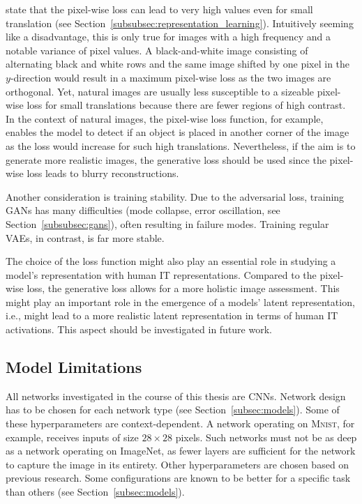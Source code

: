 \citet{larsen2015autoencoding} state that the pixel-wise loss can lead to very high values even for small translation (see Section~\ref{subsubsec:representation_learning}).
Intuitively seeming like a disadvantage, this is only true for images with a high frequency and a notable variance of pixel values.
A black-and-white image consisting of alternating black and white rows and the same image shifted by one pixel in the $y$-direction would result in a maximum pixel-wise loss as the two images are orthogonal.
Yet, natural images are usually less susceptible to a sizeable pixel-wise loss for small translations because there are fewer regions of high contrast.
In the context of natural images, the pixel-wise loss function, for example, enables the model to detect if an object is placed in another corner of the image as the loss would increase for such high translations.
Nevertheless, if the aim is to generate more realistic images, the generative loss should be used since the pixel-wise loss leads to blurry reconstructions.

Another consideration is training stability.
Due to the adversarial loss, training \acp{GAN} has many difficulties (mode collapse, error oscillation, see Section~\ref{subsubsec:gans}), often resulting in failure modes.
Training regular \acp{VAE}, in contrast, is far more stable.

The choice of the loss function might also play an essential role in studying a model's representation with human \ac{IT} representations.
Compared to the pixel-wise loss, the generative loss allows for a more holistic image assessment.
This might play an important role in the emergence of a models' latent representation, i.e., might lead to a more realistic latent representation in terms of human IT activations.
This aspect should be investigated in future work.

\subsection{Model Limitations}\label{subsec:model-limitations}
All networks investigated in the course of this thesis are \acp{CNN}.
Network design has to be chosen for each network type (see Section~\ref{subsec:models}).
Some of these hyperparameters are context-dependent.
A network operating on \textsc{Mnist}, for example, receives inputs of size $28\times 28$ pixels.
Such networks must not be as deep as a network operating on ImageNet, as fewer layers are sufficient for the network to capture the image in its entirety.
Other hyperparameters are chosen based on previous research.
Some configurations are known to be better for a specific task than others (see Section~\ref{subsec:models}).

